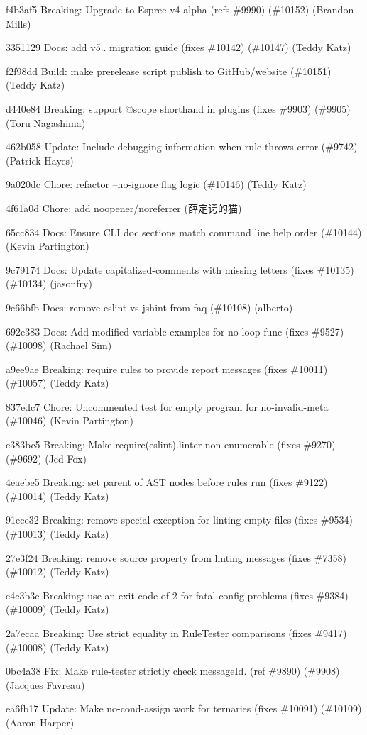 \begin{DoxyItemize}
\item f4b3af5 Breaking\+: Upgrade to Espree v4 alpha (refs \#9990) (\#10152) (Brandon Mills)
\item 3351129 Docs\+: add v5.. migration guide (fixes \#10142) (\#10147) (Teddy Katz)
\item f2f98dd Build\+: make prerelease script publish to Git\+Hub/website (\#10151) (Teddy Katz)
\item d440e84 Breaking\+: support @scope shorthand in plugins (fixes \#9903) (\#9905) (Toru Nagashima)
\item 462b058 Update\+: Include debugging information when rule throws error (\#9742) (Patrick Hayes)
\item 9a020dc Chore\+: refactor --no-\/ignore flag logic (\#10146) (Teddy Katz)
\item 4f61a0d Chore\+: add noopener/noreferrer (薛定谔的猫)
\item 65cc834 Docs\+: Ensure CLI doc sections match command line help order (\#10144) (Kevin Partington)
\item 9c79174 Docs\+: Update capitalized-\/comments with missing letters (fixes \#10135) (\#10134) (jasonfry)
\item 9e66bfb Docs\+: remove eslint vs jshint from faq (\#10108) (alberto)
\item 692e383 Docs\+: Add modified variable examples for no-\/loop-\/func (fixes \#9527) (\#10098) (Rachael Sim)
\item a9ee9ae Breaking\+: require rules to provide report messages (fixes \#10011) (\#10057) (Teddy Katz)
\item 837edc7 Chore\+: Uncommented test for empty program for no-\/invalid-\/meta (\#10046) (Kevin Partington)
\item c383bc5 Breaking\+: Make require(\textquotesingle{}eslint\textquotesingle{}).linter non-\/enumerable (fixes \#9270) (\#9692) (Jed Fox)
\item 4eaebe5 Breaking\+: set {\ttfamily parent} of AST nodes before rules run (fixes \#9122) (\#10014) (Teddy Katz)
\item 91ece32 Breaking\+: remove special exception for linting empty files (fixes \#9534) (\#10013) (Teddy Katz)
\item 27e3f24 Breaking\+: remove {\ttfamily source} property from linting messages (fixes \#7358) (\#10012) (Teddy Katz)
\item e4c3b3c Breaking\+: use an exit code of 2 for fatal config problems (fixes \#9384) (\#10009) (Teddy Katz)
\item 2a7ecaa Breaking\+: Use strict equality in Rule\+Tester comparisons (fixes \#9417) (\#10008) (Teddy Katz)
\item 0bc4a38 Fix\+: Make rule-\/tester strictly check message\+Id. (ref \#9890) (\#9908) (Jacques Favreau)
\item ea6fb17 Update\+: Make no-\/cond-\/assign work for ternaries (fixes \#10091) (\#10109) (Aaron Harper)
\end{DoxyItemize}

